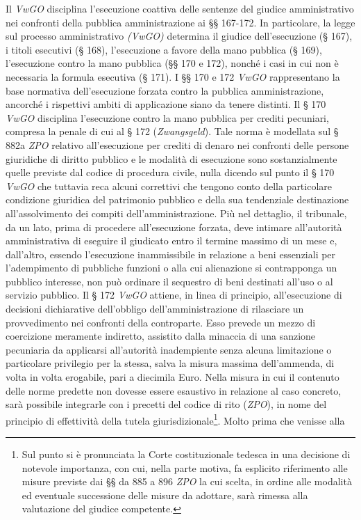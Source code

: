 \documentclass[12pt,it,a4paper,]{report}
\begin{document}
Il \emph{VwGO} disciplina l'esecuzione coattiva delle sentenze del
giudice amministrativo nei confronti della pubblica amministrazione ai
§§ 167-172. In particolare, la legge sul processo amministrativo
\emph{(VwGO)} determina il giudice dell'esecuzione (§ 167), i titoli
esecutivi (§ 168), l'esecuzione a favore della mano pubblica (§ 169),
l'esecuzione contro la mano pubblica (§§ 170 e 172), nonché i casi in
cui non è necessaria la formula esecutiva (§ 171). I §§ 170 e 172
\emph{VwGO} rappresentano la base normativa dell'esecuzione forzata
contro la pubblica amministrazione, ancorché i rispettivi ambiti di
applicazione siano da tenere distinti. Il § 170 \emph{VwGO} disciplina
l'esecuzione contro la mano pubblica per crediti pecuniari, compresa la
penale di cui al § 172 (\emph{Zwangsgeld}). Tale norma è modellata sul §
882a \emph{ZPO} relativo all'esecuzione per crediti di denaro nei
confronti delle persone giuridiche di diritto pubblico e le modalità di
esecuzione sono sostanzialmente quelle previste dal codice di procedura
civile, nulla dicendo sul punto il § 170 \emph{VwGO} che tuttavia reca
alcuni correttivi che tengono conto della particolare condizione
giuridica del patrimonio pubblico e della sua tendenziale destinazione
all'assolvimento dei compiti dell'amministrazione. Più nel dettaglio, il
tribunale, da un lato, prima di procedere all'esecuzione forzata, deve
intimare all'autorità amministrativa di eseguire il giudicato entro il
termine massimo di un mese e, dall'altro, essendo l'esecuzione
inammissibile in relazione a beni essenziali per l'adempimento di
pubbliche funzioni o alla cui alienazione si contrapponga un pubblico
interesse, non può ordinare il sequestro di beni destinati all'uso o al
servizio pubblico. Il § 172 \emph{VwGO} attiene, in linea di principio,
all'esecuzione di decisioni dichiarative dell'obbligo
dell'amministrazione di rilasciare un provvedimento nei confronti della
controparte. Esso prevede un mezzo di coercizione meramente indiretto,
assistito dalla minaccia di una sanzione pecuniaria da applicarsi
all'autorità inadempiente senza alcuna limitazione o particolare
privilegio per la stessa, salva la misura massima dell'ammenda, di volta
in volta erogabile, pari a diecimila Euro. Nella misura in cui il
contenuto delle norme predette non dovesse essere esaustivo in relazione
al caso concreto, sarà possibile integrarle con i precetti del codice di
rito (\emph{ZPO}), in nome del principio di effettività della tutela
giurisdizionale\footnote{Sul punto si è pronunciata la Corte
  costituzionale tedesca in una decisione di notevole importanza, con
  cui, nella parte motiva, fa esplicito riferimento alle misure previste
  dai §§ da 885 a 896 \emph{ZPO} la cui scelta, in ordine alle modalità
  ed eventuale successione delle misure da adottare, sarà rimessa alla
  valutazione del giudice competente.}. Molto prima che venisse alla
\end{document}
